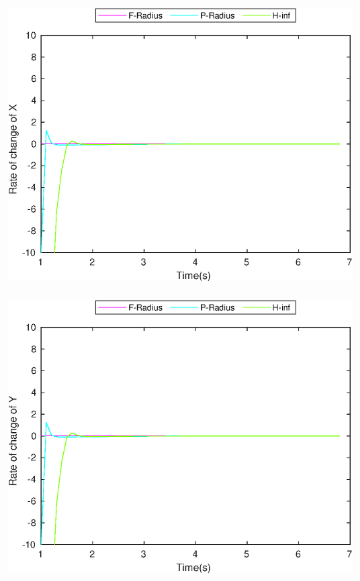 \begin{figure}[h]
\begin{subfigure}{.5\linewidth}
\centering
\includegraphics[width=\linewidth]{figures/BoundChange/CA/ca_bound_changeX}
\end{subfigure}
\begin{subfigure}{.5\linewidth}
\centering
\includegraphics[width=\linewidth]{figures/BoundChange/CA/ca_bound_changeY}
\end{subfigure}
\begin{subfigure}{.5\linewidth}
\centering

\end{subfigure}
\end{figure}
